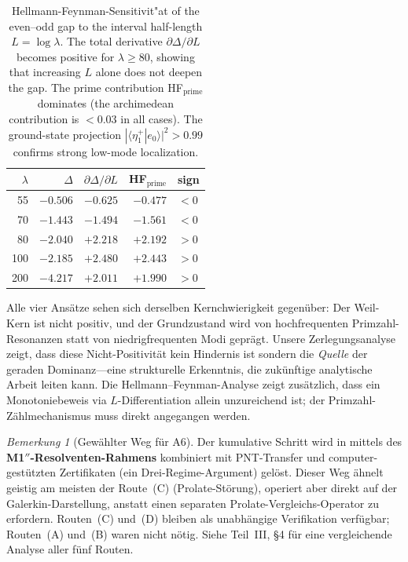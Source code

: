 \documentclass[12pt,a4paper]{article}
\theoremstyle{definition}
\theoremstyle{remark}
\newtheorem{remark}[theorem]{Bemerkung}
\begin{document}
\begin{table}[h]
\centering
\renewcommand{\arraystretch}{1.15}
\begin{tabular}{r|r|r|r|l}
$\lambda$ & $\Delta$ & $\partial\Delta/\partial L$ & HF$_{\mathrm{prime}}$ & sign \\\hline
55  & $-0.506$ & $-0.625$ & $-0.477$ & $<0$ \\
70  & $-1.443$ & $-1.494$ & $-1.561$ & $<0$ \\
80  & $-2.040$ & $+2.218$ & $+2.192$ & $>0$ \\
100 & $-2.185$ & $+2.480$ & $+2.443$ & $>0$ \\
200 & $-4.217$ & $+2.011$ & $+1.990$ & $>0$ \\
\end{tabular}
\caption{Hellmann-Feynman-Sensitivit"at of the even--odd gap to the interval half-length $L = \log\lambda$. The total derivative $\partial\Delta/\partial L$ becomes positive for $\lambda \geq 80$, showing that increasing $L$ alone does not deepen the gap. The prime contribution HF$_{\mathrm{prime}}$ dominates (the archimedean contribution is $< 0.03$ in all cases). The ground-state projection $|\langle \eta^+_1 | e_0 \rangle|^2 > 0.99$ confirms strong low-mode localization.}
\label{tab:hf-results}
\end{table}

Alle vier Ansätze sehen sich derselben Kernchwierigkeit gegenüber: Der Weil-Kern ist nicht positiv, und der Grundzustand wird von hochfrequenten Primzahl-Resonanzen statt von niedrigfrequenten Modi geprägt. Unsere Zerlegungsanalyse zeigt, dass diese Nicht-Positivität kein Hindernis ist sondern die \emph{Quelle} der geraden Dominanz---eine strukturelle Erkenntnis, die zukünftige analytische Arbeit leiten kann. Die Hellmann--Feynman-Analyse zeigt zusätzlich, dass ein Monotoniebeweis via $L$-Differentiation allein unzureichend ist; der Primzahl-Zählmechanismus muss direkt angegangen werden.

\begin{remark}[Gewählter Weg für A6]
Der kumulative Schritt wird in  mittels des \textbf{M1$''$-Resolventen-Rahmens} kombiniert mit PNT-Transfer und computer-gestützten Zertifikaten (ein Drei-Regime-Argument) gelöst. Dieser Weg ähnelt geistig am meisten der Route~(C) (Prolate-Störung), operiert aber direkt auf der Galerkin-Darstellung, anstatt einen separaten Prolate-Vergleichs-Operator zu erfordern. Routen~(C) und~(D) bleiben als unabhängige Verifikation verfügbar; Routen~(A) und~(B) waren nicht nötig. Siehe Teil~III, \S4 für eine vergleichende Analyse aller fünf Routen.
\end{remark}
\end{document}

